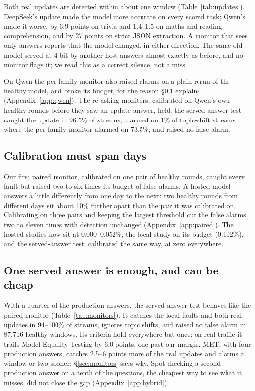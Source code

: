 \documentclass[11pt]{article}
\begin{document}
Both real updates are detected within about one window (Table~\ref{tab:updates}).
DeepSeek's update made the model more accurate on every scored task; Qwen's made
it worse, by 6.9 points on trivia and 1.4--1.5 on maths and reading comprehension,
and by 27 points on strict JSON extraction. A monitor
that sees only answers reports that the model changed, in either direction. The
same old model served at 4-bit by another host answers almost exactly as before,
and no monitor flags it; we read this as a correct silence, not a miss.

On Qwen the per-family monitor also raised alarms on a plain rerun of the healthy
model, and broke its budget, for the reason \S\ref{sec:days} explains
(Appendix~\ref{app:qwen}). The re-asking monitors, calibrated on Qwen's own
healthy rounds before they saw an update answer, held: the served-answer test
caught the update in 96.5\% of streams, alarmed on 1\% of topic-shift streams
where the per-family monitor alarmed on 73.5\%, and raised no false alarm.

\subsection{Calibration must span days}
\label{sec:days}

Our first paired monitor, calibrated on one pair of healthy rounds, caught every
fault but raised two to six times its budget of false alarms. A hosted model
answers a little differently from one day to the next: two healthy rounds from
different days sit about 10\% further apart than the pair it was calibrated on.
Calibrating on three pairs and keeping the largest threshold cut the false alarms
two to eleven times with detection unchanged (Appendix~\ref{app:paired}). The hosted
studies now sit at 0.000--0.052\%, the local study on its budget (0.102\%), and the
served-answer test, calibrated the same way, at zero everywhere.

\subsection{One served answer is enough, and can be cheap}
\label{sec:cost}

With a quarter of the production answers, the served-answer test behaves like the
paired monitor (Table~\ref{tab:monitors}). It catches the local faults and both
real updates in 94--100\% of streams, ignores topic shifts, and raised no false
alarm in 87{,}716 healthy windows. Its criteria hold everywhere but once: on real
traffic it trails Model Equality Testing by 6.0 points, one past our margin. MET,
with four production answers, catches 2.5--6 points more of the real updates and
alarms a window or two sooner; \S\ref{sec:monitors} says why. Spot-checking a
second production answer on a tenth of the questions, the cheapest way to see what
it misses, did not close the gap (Appendix~\ref{app:hybrid}).
\end{document}

